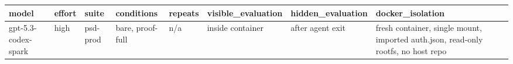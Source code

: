 \begin{tabular}{llllllll}
\toprule
model & effort & suite & conditions & repeats & visible_evaluation & hidden_evaluation & docker_isolation \\
\midrule
gpt-5.3-codex-spark & high & psd-prod & bare, proof-full & n/a & inside container & after agent exit & fresh container, single mount, imported auth.json, read-only rootfs, no host repo \\
\bottomrule
\end{tabular}
